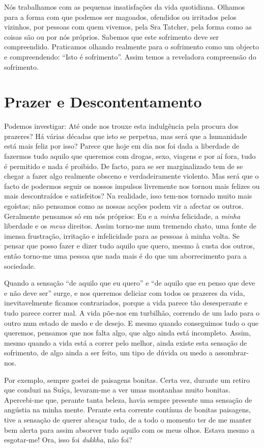 Nós trabalhamos com as pequenas insatisfações da vida quotidiana. Olhamos para a
forma com que podemos ser magoados, ofendidos ou irritados pelos vizinhos, por
pessoas com quem vivemos, pela Sra Tatcher, pela forma como as coisas são ou por
nós próprios. Sabemos que este sofrimento deve ser compreendido. Praticamos
olhando realmente para o sofrimento como um objecto e compreendendo: “Isto é
sofrimento”. Assim temos a reveladora compreensão do sofrimento.

\section{Prazer e Descontentamento}

Podemos investigar: Até onde nos trouxe esta indulgência pela procura dos
prazeres? Há várias décadas que isto se perpetua, mas será que a humanidade está
mais feliz por isso? Parece que hoje em dia nos foi dada a liberdade de fazermos
tudo aquilo que queremos com drogas, sexo, viagens e por aí fora, tudo é
permitido e nada é proibido. De facto, para se ser marginalizado tem de se
chegar a fazer algo realmente obsceno e verdadeiramente violento. Mas será que o
facto de podermos seguir os nossos impulsos livremente nos tornou mais felizes
ou mais descontraídos e satisfeitos? Na realidade, isso tem-nos tornado muito
mais egoístas; não pensamos como as nossas acções podem vir a afectar os outros.
Geralmente pensamos só em nós próprios: Eu e a \emph{minha} felicidade, a
\emph{minha} liberdade e os \emph{meus} direitos. Assim torno-me num tremendo
chato, uma fonte de imensa frustração, irritação e infelicidade para as pessoas
à minha volta. Se pensar que posso fazer e dizer tudo aquilo que quero, mesmo à
custa dos outros, então torno-me uma pessoa que nada mais é do que um
aborrecimento para a sociedade.

Quando a sensação “de aquilo que eu quero” e “de aquilo que eu penso que deve e
não deve ser” surge, e nos queremos deliciar com todos os prazeres da vida,
inevitavelmente ficamos contrariados, porque a vida parece tão desesperante e
tudo parece correr mal. A vida põe-nos em turbilhão, correndo de um lado para o
outro num estado de medo e de desejo. E mesmo quando conseguimos tudo o que
queremos, pensamos que nos falta algo, que algo ainda está incompleto. Assim,
mesmo quando a vida está a correr pelo melhor, ainda existe esta sensação de
sofrimento, de algo ainda a ser feito, um tipo de dúvida ou medo a
assombrar-nos.

Por exemplo, sempre gostei de paisagens bonitas. Certa vez, durante um retiro
que conduzi na Suíça, levaram-me a ver umas montanhas muito bonitas. Apercebi-me
que, perante tanta beleza, havia sempre presente uma sensação de angústia na
minha mente. Perante esta corrente contínua de bonitas paisagens, tive a
sensação de querer abraçar tudo, de a todo o momento ter de me manter bem alerta
para assim absorver tudo aquilo com os meus olhos. Estava mesmo a esgotar-me!
Ora, isso foi \emph{dukkha}, não foi?


